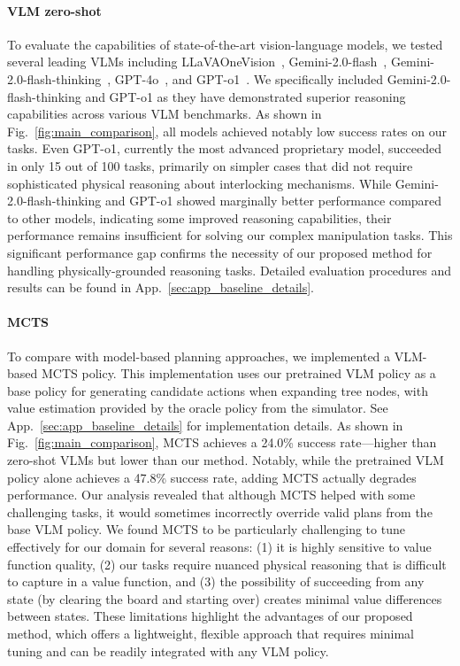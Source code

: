 \paragraph{VLM zero-shot} To evaluate the capabilities of state-of-the-art vision-language models, we tested several leading VLMs including LLaVAOneVision~\citep{llavaonevision}, Gemini-2.0-flash~\citep{google2024gemini}, Gemini-2.0-flash-thinking~\citep{google2024gemini}, GPT-4o~\citep{openai2024gpt4ocard}, and GPT-o1~\citep{openai2024openaio1card}. We specifically included Gemini-2.0-flash-thinking and GPT-o1 as they have demonstrated superior reasoning capabilities across various VLM benchmarks. As shown in Fig.~\ref{fig:main_comparison}, all models achieved notably low success rates on our tasks. Even GPT-o1, currently the most advanced proprietary model, succeeded in only 15 out of 100 tasks, primarily on simpler cases that did not require sophisticated physical reasoning about interlocking mechanisms. While Gemini-2.0-flash-thinking and GPT-o1 showed marginally better performance compared to other models, indicating some improved reasoning capabilities, their performance remains insufficient for solving our complex manipulation tasks. This significant performance gap confirms the necessity of our proposed method for handling physically-grounded reasoning tasks. Detailed evaluation procedures and results can be found in App.~\ref{sec:app_baseline_details}.



\paragraph{MCTS} To compare with model-based planning approaches, we implemented a VLM-based MCTS policy. This implementation uses our pretrained VLM policy as a base policy for generating candidate actions when expanding tree nodes, with value estimation provided by the oracle policy from the simulator. See App.~\ref{sec:app_baseline_details} for implementation details. As shown in Fig.~\ref{fig:main_comparison}, MCTS achieves a 24.0\% success rate—higher than zero-shot VLMs but lower than our method. Notably, while the pretrained VLM policy alone achieves a 47.8\% success rate, adding MCTS actually degrades performance. Our analysis revealed that although MCTS helped with some challenging tasks, it would sometimes incorrectly override valid plans from the base VLM policy. We found MCTS to be particularly challenging to tune effectively for our domain for several reasons: (1) it is highly sensitive to value function quality, (2) our tasks require nuanced physical reasoning that is difficult to capture in a value function, and (3) the possibility of succeeding from any state (by clearing the board and starting over) creates minimal value differences between states. These limitations highlight the advantages of our proposed method, which offers a lightweight, flexible approach that requires minimal tuning and can be readily integrated with any VLM policy.


